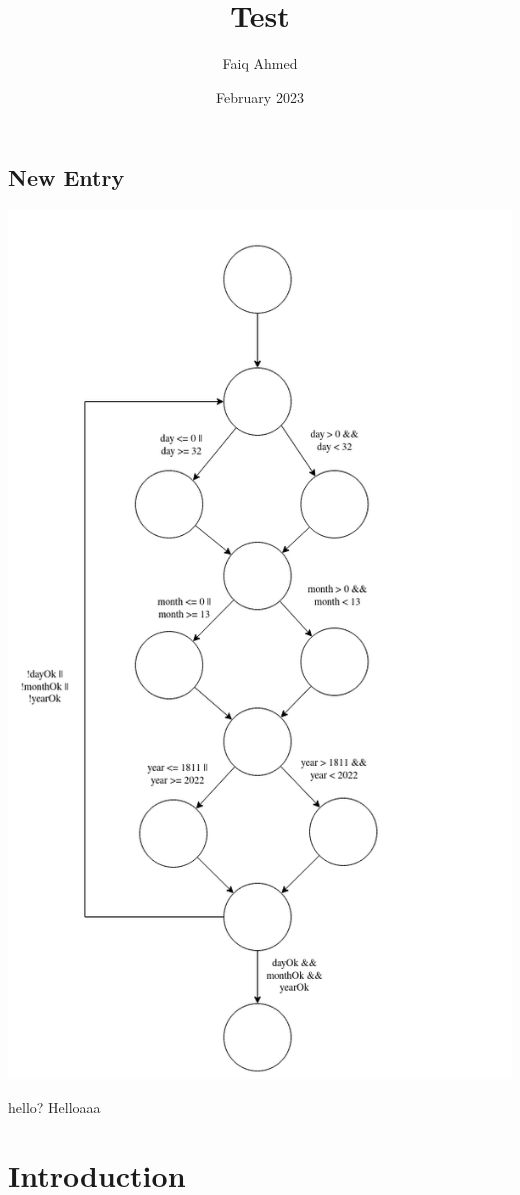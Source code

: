 \documentclass{article}
\title{Test}
\author{Faiq Ahmed}
\date{February 2023}
\begin{document}
\maketitle
\subsection{New Entry}
\includegraphics[width=\linewidth]{Q2a.png}

hello?
Helloaaa

\section{Introduction}
\end{document}
